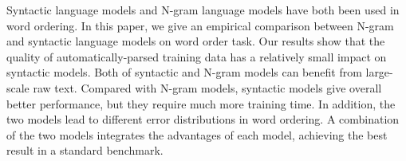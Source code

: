 Syntactic language models and N-gram language models have both been used in word ordering. In this paper, we give an empirical comparison between N-gram and syntactic language models on word order task. Our results show that the quality of automatically-parsed training data has a relatively small impact on syntactic models. Both of syntactic and N-gram models can benefit from large-scale raw text. Compared with N-gram models, syntactic models give overall better performance, but they require much more training time. In addition, the two models lead to different error distributions in word ordering. A combination of the two models integrates the advantages of each model, achieving the best result in a standard benchmark.
